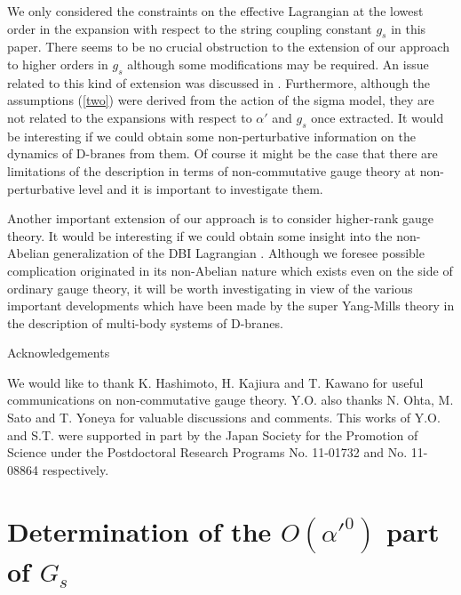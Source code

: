 \documentclass[a4paper,12pt]{article}
\begin{document}
We only considered the constraints on the effective Lagrangian
at the lowest order in the expansion
with respect to the string coupling constant $g_s$
in this paper.
There seems to be no crucial obstruction
to the extension of our approach to higher orders in $g_s$
although some modifications may be required.
An issue related to this kind of extension was discussed
in \cite{Andreev}.
Furthermore, although the assumptions (\ref{two}) were
derived from the action of the sigma model,
they are not related to the expansions with respect to
$\alpha'$ and $g_s$ once extracted.
It would be interesting
if we could obtain some non-perturbative information
on the dynamics of D-branes from them.
Of course it might be the case that
there are limitations of the description
in terms of non-commutative gauge theory
at non-perturbative level
and it is important to investigate them.

Another important extension of our approach
is to consider higher-rank gauge theory.
It would be interesting if we could obtain
some insight into the non-Abelian generalization
of the DBI Lagrangian \cite{NDBI}.
Although we foresee possible complication
originated in its non-Abelian nature
which exists even on the side of ordinary gauge theory,
it will be worth investigating
in view of the various important developments which have been made
by the super Yang-Mills theory
in the description of multi-body systems of D-branes.

\vspace{0.4cm}
\noindent
Acknowledgements

We would like to thank K. Hashimoto, H. Kajiura and T. Kawano
for useful communications on non-commutative gauge theory.
Y.O. also thanks N. Ohta, M. Sato and T. Yoneya
for valuable discussions and comments. 
This works of Y.O. and S.T. were supported in part
by the Japan Society for the Promotion of Science
under the Postdoctoral Research Programs No. 11-01732
and No. 11-08864 respectively.

\newpage
\appendix
\renewcommand{\thesection}{Appendix \Alph{section}.}
\renewcommand{\theequation}{\Alph{section}.\arabic{equation}}

\section{Determination of the $O(\alpha'^0)$ part of $G_s$}
\setcounter{equation}{0}
\indent
\end{document}
